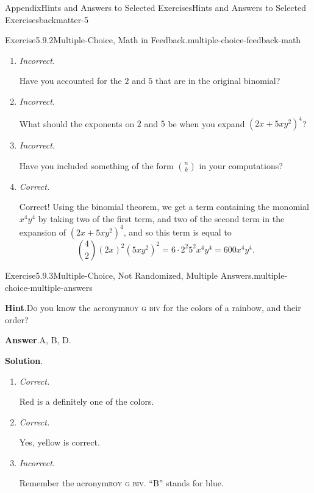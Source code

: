 \documentclass[oneside,10pt,]{book}
\newcommand{\blocktitlefont}{\relax}
\newcommand{\acronym}[1]{\textsc{\MakeLowercase{#1}}}
\newcommand{\lititle}[1]{{\slshape#1}}
\numberwithin{equation}{section}
\begin{document}
\begin{solutions-chapter}{Appendix}{Hints and Answers to Selected Exercises}{}{Hints and Answers to Selected Exercises}{}{}{backmatter-5}
\begin{divisionsolution}{Exercise}{5.9.2}{Multiple-Choice, Math in Feedback.}{multiple-choice-feedback-math}
\begin{enumerate}[label={\Alph*.}]
\item{}\lititle{Incorrect.}\par%
Have you accounted for the \(2\) and \(5\) that are in the original binomial?%
\item{}\lititle{Incorrect.}\par%
What should the exponents on \(2\) and \(5\) be when you expand \((2x+5xy^2)^4\)?%
\item{}\lititle{Incorrect.}\par%
Have you included something of the form \(\binom{n}{k}\) in your computations?%
\item{}\lititle{Correct.}\par%
Correct! Using the binomial theorem, we get a term containing the monomial \(x^4y^4\) by taking two of the first term, and two of the second term in the expansion of \((2x+5xy^2)^4\), and so this term is equal to%
\begin{equation*}
\binom{4}{2} (2x)^2 (5xy^2)^2 = 6 \cdot 2^2 5^2 x^4 y^4 = 600 x^4 y^4\text{.}
\end{equation*}
%
\end{enumerate}
%
\end{divisionsolution}%
\begin{divisionsolution}{Exercise}{5.9.3}{Multiple-Choice, Not Randomized, Multiple Answers.}{multiple-choice-multiple-answers}%
\par\smallskip%
\noindent\textbf{\blocktitlefont Hint}.\hypertarget{multiple-choice-multiple-answers-4-back}{}\quad{}Do you know the acronym\textellipsis{}\acronym{ROY G BIV} for the colors of a rainbow, and their order?%
\par\smallskip%
\noindent\textbf{\blocktitlefont Answer}.\hypertarget{multiple-choice-multiple-answers-5-back}{}\quad{}A, B, D.%
\par\smallskip%
\noindent\textbf{\blocktitlefont Solution}.\hypertarget{multiple-choice-multiple-answers-6-back}{}\quad{}%
\begin{enumerate}[label={\Alph*.}]
\item{}\lititle{Correct.}\par%
Red is a definitely one of the colors.%
\item{}\lititle{Correct.}\par%
Yes, yellow is correct.%
\item{}\lititle{Incorrect.}\par%
Remember the acronym\textellipsis{}\acronym{ROY G BIV}.  ``B'' stands for blue.%

\end{enumerate}
\end{divisionsolution}
\end{solutions-chapter}
\end{document}
